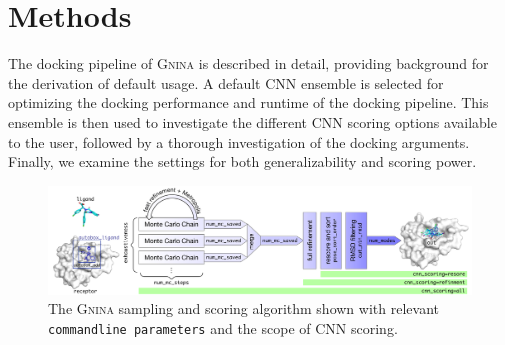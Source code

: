 \documentclass[journal=jcisd8,manuscript=article]{achemso}
\begin{document}
\section{Methods}

The docking pipeline of \textsc{Gnina} is described in detail, providing background for the derivation of default usage. A default CNN ensemble is selected for optimizing the docking performance and runtime of the docking pipeline. This ensemble is then used to investigate the different CNN scoring options available to the user, followed by a thorough investigation of the docking arguments. Finally, we examine the settings for both generalizability and scoring power.

\begin{figure}[tb]
    \centering
    \includegraphics[width=\linewidth]{figures/gnina}
    \caption{The \textsc{Gnina} sampling and scoring algorithm shown with relevant \texttt{commandline parameters} and the scope of CNN scoring.}
    \label{fig:workflow}
\end{figure}
\end{document}
